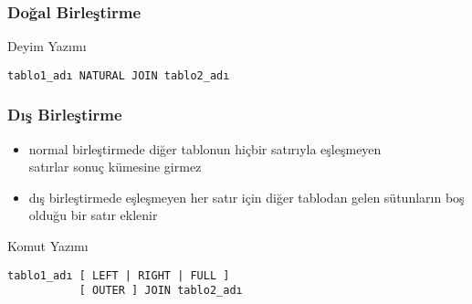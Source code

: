 \documentclass[dvipsnames]{beamer}
\theoremstyle{definition}
\theoremstyle{example}
\theoremstyle{plain}
\begin{document}
\begin{frame}[fragile]
  \frametitle{Doğal Birleştirme}

  \begin{block}{Deyim Yazımı}
    \begin{lstlisting}
tablo1_adı NATURAL JOIN tablo2_adı
    \end{lstlisting}
  \end{block}
\end{frame}

\begin{frame}[fragile]
  \frametitle{Dış Birleştirme}

  \begin{itemize}
    \item normal birleştirmede diğer tablonun hiçbir satırıyla eşleşmeyen\\
      satırlar sonuç kümesine girmez

    \item dış birleştirmede eşleşmeyen her satır için diğer tablodan gelen
      sütunların boş olduğu bir satır eklenir
  \end{itemize}

  \pause
  \begin{block}{Komut Yazımı}
    \begin{lstlisting}
tablo1_adı [ LEFT | RIGHT | FULL ]
           [ OUTER ] JOIN tablo2_adı
    \end{lstlisting}
  \end{block}
\end{frame}
\end{document}
